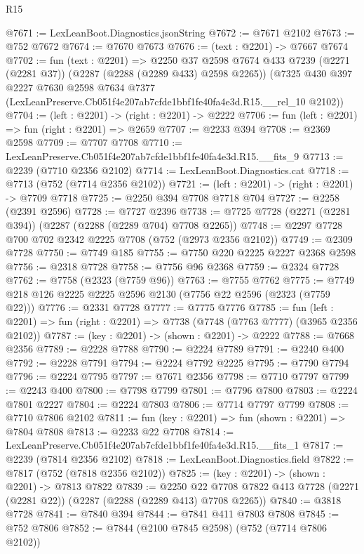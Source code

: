 \begin{lexlean}{R15}
\begin{coremodule}
@7671 := LexLeanBoot.Diagnostics.jsonString
@7672 := @7671 @2102
@7673 := @752 @7672
@7674 := @7670 @7673
@7676 := (text : @2201) -> @7667 @7674
@7702 := fun (text : @2201) =>
  @2250
    @37
    @2598
    @7674
    @433
    @7239
    (@2271 (@2281 @37))
    (@2287 (@2288 (@2289 @433) @2598 @2265))
    (@7325
      @430
      @397
      @2227
      @7630
      @2598
      @7634
      @7377
      (LexLeanPreserve.Cb051f4e207ab7cfde1bbf1fe40fa4e3d.R15.__rel_10 @2102))
@7704 := (left : @2201) -> (right : @2201) -> @2222
@7706 := fun (left : @2201) => fun (right : @2201) => @2659
@7707 := @2233 @394
@7708 := @2369 @2598
@7709 := @7707 @7708
@7710 := LexLeanPreserve.Cb051f4e207ab7cfde1bbf1fe40fa4e3d.R15.__fits_9
@7713 := @2239 (@7710 @2356 @2102)
@7714 := LexLeanBoot.Diagnostics.cat
@7718 := @7713 (@752 (@7714 @2356 @2102))
@7721 := (left : @2201) -> (right : @2201) -> @7709 @7718
@7725 := @2250 @394 @7708 @7718 @704
@7727 := @2258 (@2391 @2596)
@7728 := @7727 @2396
@7738 := @7725 @7728 (@2271 (@2281 @394)) (@2287 (@2288 (@2289 @704) @7708 @2265))
@7748 := @2297 @7728 @700 @702 @2342 @2225 @7708 (@752 (@2973 @2356 @2102))
@7749 := @2309 @7728
@7750 := @7749 @185
@7755 := @7750 @220 @2225 @2227 @2368 @2598
@7756 := @2318 @7728
@7758 := @7756 @96 @2368
@7759 := @2324 @7728
@7762 := @7758 (@2323 (@7759 @96))
@7763 := @7755 @7762
@7775 := @7749 @218 @126 @2225 @2225 @2596 @2130 (@7756 @22 @2596 (@2323 (@7759 @22)))
@7776 := @2331 @7728
@7777 := @7775 @7776
@7785 := fun (left : @2201) =>
  fun (right : @2201) => @7738 (@7748 (@7763 @7777) (@3965 @2356 @2102))
@7787 := (key : @2201) -> (shown : @2201) -> @2222
@7788 := @7668 @2356
@7789 := @2228 @7788
@7790 := @2224 @7789
@7791 := @2240 @400
@7792 := @2228 @7791
@7794 := @2224 @7792 @2225
@7795 := @7790 @7794
@7796 := @2224 @7795
@7797 := @7671 @2356
@7798 := @7710 @7797
@7799 := @2243 @400
@7800 := @7798 @7799
@7801 := @7796 @7800
@7803 := @2224 @7801 @2227
@7804 := @2224 @7803
@7806 := @7714 @7797 @7799
@7808 := @7710 @7806 @2102
@7811 := fun (key : @2201) => fun (shown : @2201) => @7804 @7808
@7813 := @2233 @22 @7708
@7814 := LexLeanPreserve.Cb051f4e207ab7cfde1bbf1fe40fa4e3d.R15.__fits_1
@7817 := @2239 (@7814 @2356 @2102)
@7818 := LexLeanBoot.Diagnostics.field
@7822 := @7817 (@752 (@7818 @2356 @2102))
@7825 := (key : @2201) -> (shown : @2201) -> @7813 @7822
@7839 := @2250
    @22
    @7708
    @7822
    @413
    @7728
    (@2271 (@2281 @22))
    (@2287 (@2288 (@2289 @413) @7708 @2265))
@7840 := @3818 @7728
@7841 := @7840 @394
@7844 := @7841 @411 @7803 @7808
@7845 := @752 @7806
@7852 := @7844 (@2100 @7845 @2598) (@752 (@7714 @7806 @2102))

\end{coremodule}
\end{lexlean}
